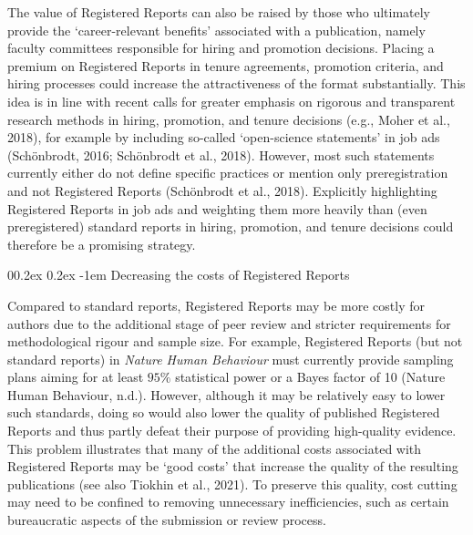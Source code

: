 \documentclass[
  british,
  a4paper,
  ,man,mask,floatsintext]{apa6}
\makeatletter
\let\oldparagraph\paragraph
\renewcommand{\paragraph}{
    \@ifstar
      \xxxParagraphStar
      \xxxParagraphNoStar
  }
\newcommand{\xxxParagraphStar}[1]{\oldparagraph*{#1}\mbox{}}
\newcommand{\xxxParagraphNoStar}[1]{\oldparagraph{#1}\mbox{}}
\renewcommand{\paragraph}{\@startsection{paragraph}{4}{\parindent}%
  {0\baselineskip \@plus 0.2ex \@minus 0.2ex}%
  {-1em}%
  {\normalfont\normalsize\bfseries\itshape\typesectitle}}
\makeatother
\begin{document}
The value of Registered Reports can also be raised by those who ultimately provide the `career-relevant benefits' associated with a publication, namely faculty committees responsible for hiring and promotion decisions.
Placing a premium on Registered Reports in tenure agreements, promotion criteria, and hiring processes could increase the attractiveness of the format substantially.
This idea is in line with recent calls for greater emphasis on rigorous and transparent research methods in hiring, promotion, and tenure decisions (e.g., Moher et al., 2018), for example by including so-called `open-science statements' in job ads (Schönbrodt, 2016; Schönbrodt et al., 2018).
However, most such statements currently either do not define specific practices or mention only preregistration and not Registered Reports (Schönbrodt et al., 2018).
Explicitly highlighting Registered Reports in job ads and weighting them more heavily than (even preregistered) standard reports in hiring, promotion, and tenure decisions could therefore be a promising strategy.

\par\vspace{0.4\baselineskip}

\paragraph{Decreasing the costs of Registered Reports}\label{decreasing-the-costs-of-registered-reports}

Compared to standard reports, Registered Reports may be more costly for authors due to the additional stage of peer review
and stricter requirements for methodological rigour and sample size.
For example, Registered Reports (but not standard reports) in \emph{Nature Human Behaviour} must currently provide sampling plans aiming for at least \(95\%\) statistical power or a Bayes factor of 10 (Nature Human Behaviour, n.d.).
However, although it may be relatively easy to lower such standards,
doing so would also lower the quality of published Registered Reports and thus partly defeat their purpose of providing high-quality evidence.
This problem illustrates that many of the additional costs associated with Registered Reports may be `good costs' that increase the quality of the resulting publications (see also Tiokhin et al., 2021).
To preserve this quality, cost cutting may need to be confined to removing unnecessary inefficiencies, such as certain bureaucratic aspects of the submission or review process.
\end{document}
